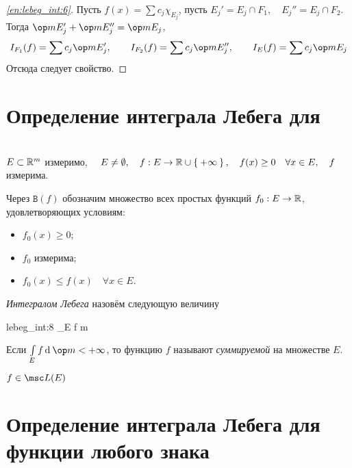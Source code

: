\begin{proof}[\ref{en:lebeg_int:6}]
	Пусть $ f(x) = \sum c_j \chi_{E_j} $, пусть $ E_j' = E_j \cap F_1, \quad E_j'' = E_j \cap F_2 $. \\
	Тогда $ \op m E_j' + \op m E_j'' = \op m E_j $,
	$$ I_{F_1}(f) = \sum c_j \op m E_j', \qquad I_{F_2}(f) = \sum c_j \op m E_j'', \qquad I_E(f) = \sum c_j \op m E_j $$
	Отсюда следует свойство.
\end{proof}

\section{Определение интеграла Лебега для }

\begin{definition}\hfill \\
	$ E \subset \mathbb{R}^m $ измеримо, $ \quad E \ne \emptyset, \quad f : E \to \mathbb{R} \cup \Set{+\infty}, \quad f(x) \ge 0 \quad \forall x \in E, \quad f $ измерима.

	Через $ \mathtt B(f) $ обозначим множество всех простых функций $ f_0 : E \to \mathbb{R} $, удовлетворяющих условиям:
	\begin{itemize}
		\item $ f_0(x) \ge 0 $;
		\item $ f_0 $ измерима;
		\item $ f_0(x) \le f(x) \quad \forall x \in E $.
	\end{itemize}

	\emph{Интегралом Лебега} назовём следующую величину
	\begin{equ}{lebeg_int:8}
		\int\limits_E f \di \op m \coloneq \sup {}
	\end{equ}
\end{definition}

\begin{definition}
	Если $ \int\limits_E f \di \op m < +\infty $, то функцию $ f $ называют \emph{суммируемой} на множестве $ E $.
\end{definition}

\begin{notation}
	$ f \in \msc L(E) $
\end{notation}

\section{Определение интеграла Лебега для функции любого знака}

